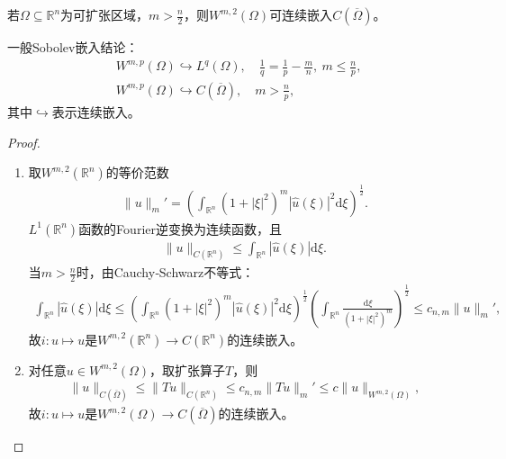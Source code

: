 \documentclass[../../main.tex]{subfiles}%
\begin{document}
\begin{theorem}[Sobolev嵌入定理]\label{theorem:泛函分析--Sobolev嵌入定理}
若$\Omega\subseteq\mathbb{R}^{n}$为可扩张区域，$m>\frac{n}{2}$，则$W^{m,2}(\Omega)$可连续嵌入$C(\overline{\Omega})$。
\end{theorem}
\begin{remark}
一般Sobolev嵌入结论：
\begin{align*}
&W^{m,p}(\Omega)\hookrightarrow L^{q}(\Omega),\quad \frac{1}{q}=\frac{1}{p}-\frac{m}{n},\ m\leqslant\frac{n}{p},\\
&W^{m,p}(\Omega)\hookrightarrow C(\overline{\Omega}),\quad m>\frac{n}{p},
\end{align*}
其中$\hookrightarrow$表示连续嵌入。
\end{remark}
\begin{proof}
\begin{enumerate}[(1)]
\item 取$W^{m,2}(\mathbb{R}^{n})$的等价范数
\begin{align*}
\|u\|_{m}'=\left(\int_{\mathbb{R}^{n}}(1+|\xi|^{2})^{m}|\widehat{u}(\xi)|^{2}\mathrm{d}\xi\right)^{\frac{1}{2}}.
\end{align*}
$L^{1}(\mathbb{R}^{n})$函数的Fourier逆变换为连续函数，且
\begin{align*}
\|u\|_{C(\mathbb{R}^{n})}\leqslant\int_{\mathbb{R}^{n}}|\widehat{u}(\xi)|\mathrm{d}\xi.
\end{align*}
当$m>\frac{n}{2}$时，由Cauchy‑Schwarz不等式：
\begin{align*}
\int_{\mathbb{R}^{n}}|\widehat{u}(\xi)|\mathrm{d}\xi\leqslant\left(\int_{\mathbb{R}^{n}}(1+|\xi|^{2})^{m}|\widehat{u}(\xi)|^{2}\mathrm{d}\xi\right)^{\frac{1}{2}}\left(\int_{\mathbb{R}^{n}}\frac{\mathrm{d}\xi}{(1+|\xi|^{2})^{m}}\right)^{\frac{1}{2}}
\leqslant c_{n,m}\|u\|_{m}',
\end{align*}
故$i:u\mapsto u$是$W^{m,2}(\mathbb{R}^{n})\to C(\mathbb{R}^{n})$的连续嵌入。
\item 对任意$u\in W^{m,2}(\Omega)$，取扩张算子$T$，则
\begin{align*}
\|u\|_{C(\overline{\Omega})}\leqslant\|Tu\|_{C(\mathbb{R}^{n})}\leqslant c_{n,m}\|Tu\|_{m}'\leqslant c\|u\|_{W^{m,2}(\Omega)},
\end{align*}
故$i:u\mapsto u$是$W^{m,2}(\Omega)\to C(\overline{\Omega})$的连续嵌入。
\end{enumerate}
\end{proof}
\end{document}
